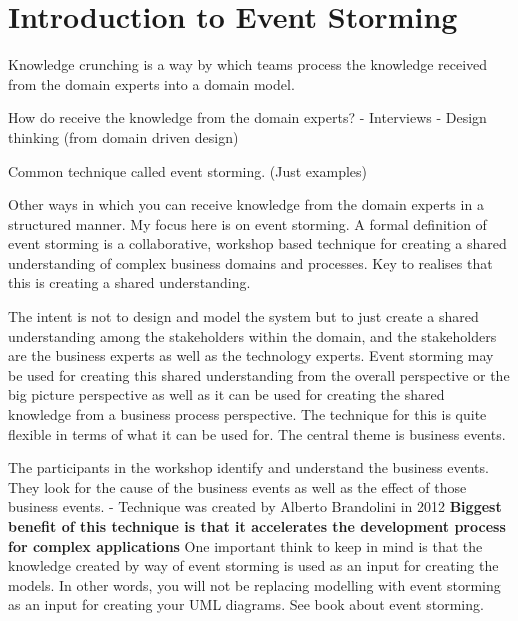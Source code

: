\section{Introduction to Event Storming}

Knowledge crunching is a way by which teams process the knowledge received from the domain experts into a domain model.

How do receive the knowledge from the domain experts?
- Interviews
- Design thinking (from domain driven design)

Common technique called event storming. (Just examples)

Other ways in which you can receive knowledge from the domain experts in a structured manner.
My focus here is on event storming.
A formal definition of event storming is a collaborative, workshop based technique for creating a shared understanding of complex business domains and processes.
Key to realises that this is creating a shared understanding.

The intent is not to design and model the system but to just create a shared understanding among the stakeholders within the domain, and the stakeholders are the business experts as well as the technology experts.
Event storming may be used for creating this shared understanding from the overall perspective or the big picture perspective as well as it can be used for creating the shared knowledge from a business process perspective.
The technique for this is quite flexible in terms of what it can be used for.
The central theme is business events.

The participants in the workshop identify and understand the business events.
They look for the cause of the business events as well as the effect of those business events.
- Technique was created by Alberto Brandolini in 2012 %
\textbf{Biggest benefit of this technique is that it accelerates the development process for complex applications}
One important think to keep in mind is that the knowledge created by way of event storming is used as an input for creating the models.
In other words, you will not be replacing modelling with event storming as an input for creating your UML diagrams. See book about event storming.


